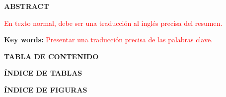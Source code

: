 \documentclass[journal]{IEEEtran}
\newenvironment{customfontsize}{
    \fontsize{12}{14}\selectfont
}{}
\begin{document}
\newpage

\begin{center}
\textbf{\fontsize{14}{16}\selectfont ABSTRACT}\\
\end{center}
\vspace{10pt}
\fontsize{12}{14}\selectfont 
{
\setlength{\parindent}{3em}
\hspace{1pt}
\textcolor{red}{En texto normal, debe ser una traducción al inglés precisa del resumen.}\\

}
\vspace{10pt}
\begin{center}
\textbf{\fontsize{12}{14}\selectfont Key words:} \textcolor{red}{Presentar una traducción precisa de las palabras clave.}
\end{center}


\newpage

\begin{center}
\textbf{\fontsize{14}{16}\selectfont TABLA DE CONTENIDO}
\end{center}

\renewcommand{\contentsname}{}
\begin{customfontsize}
    \tableofcontents
\end{customfontsize}


\newpage

\begin{center}
    \textbf{\fontsize{14}{16}\selectfont ÍNDICE DE TABLAS}
\end{center}


\renewcommand{\listtablename}{} %

\begin{customfontsize}
    \listoftables
\end{customfontsize}


\newpage
\begin{center}
    \textbf{\fontsize{14}{16}\selectfont ÍNDICE DE FIGURAS}
\end{center}


\renewcommand{\listfigurename}{} %
\end{document}
